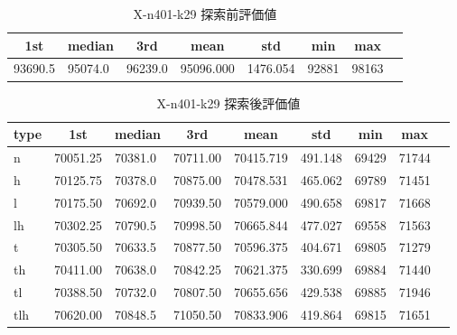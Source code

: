 \begin{table}[htbp]
    \caption{X-n401-k29 探索前評価値}
    \begin{tabular}{|l|l|l|l|l|l|l|l|}\hline
    \multicolumn{1}{|c|}{\textbf{1st}}
    &\multicolumn{1}{c|}{\textbf{median}}
    &\multicolumn{1}{c|}{\textbf{3rd}}
    &\multicolumn{1}{c|}{\textbf{mean}}
    &\multicolumn{1}{c|}{\textbf{std}}
    &\multicolumn{1}{c|}{\textbf{min}}
    &\multicolumn{1}{c|}{\textbf{max}}\\\hline
	93690.5 & 95074.0 & 96239.0 & 95096.000 & 1476.054 & 92881 & 98163\\\hline
	\end{tabular}
\end{table}
\begin{table}[htbp]
    \caption{X-n401-k29 探索後評価値}
    \begin{tabular}{|l|l|l|l|l|l|l|l|l|}\hline
    \multicolumn{1}{|c|}{\textbf{type}}
    &\multicolumn{1}{|c|}{\textbf{1st}}
    &\multicolumn{1}{c|}{\textbf{median}}
    &\multicolumn{1}{c|}{\textbf{3rd}}
    &\multicolumn{1}{c|}{\textbf{mean}}
    &\multicolumn{1}{c|}{\textbf{std}}
    &\multicolumn{1}{c|}{\textbf{min}}
    &\multicolumn{1}{c|}{\textbf{max}}\\\hline
	n & 70051.25 & 70381.0 & 70711.00 & 70415.719 & 491.148 & 69429 & 71744\\\hline
	h & 70125.75 & 70378.0 & 70875.00 & 70478.531 & 465.062 & 69789 & 71451\\\hline
	l & 70175.50 & 70692.0 & 70939.50 & 70579.000 & 490.658 & 69817 & 71668\\\hline
	lh & 70302.25 & 70790.5 & 70998.50 & 70665.844 & 477.027 & 69558 & 71563\\\hline
	t & 70305.50 & 70633.5 & 70877.50 & 70596.375 & 404.671 & 69805 & 71279\\\hline
	th & 70411.00 & 70638.0 & 70842.25 & 70621.375 & 330.699 & 69884 & 71440\\\hline
	tl & 70388.50 & 70732.0 & 70807.50 & 70655.656 & 429.538 & 69885 & 71946\\\hline
	tlh & 70620.00 & 70848.5 & 71050.50 & 70833.906 & 419.864 & 69815 & 71651\\\hline
	\end{tabular}
\end{table}
